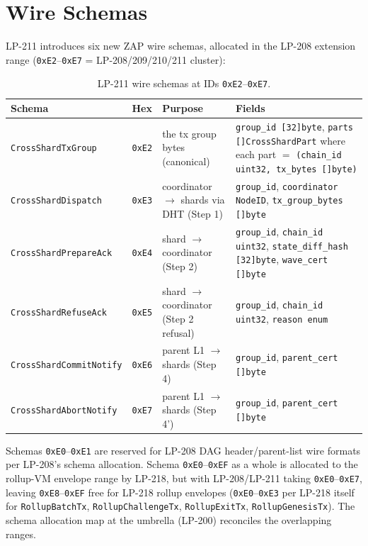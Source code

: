 \section{Wire Schemas}

LP-211 introduces six new ZAP wire schemas, allocated in the LP-208
extension range (\texttt{0xE2}--\texttt{0xE7} = LP-208/209/210/211
cluster):

\begin{table}[h]
\centering
\small
\begin{tabular}{@{}lllp{6cm}@{}}
\toprule
\textbf{Schema} & \textbf{Hex} & \textbf{Purpose} & \textbf{Fields} \\
\midrule
\texttt{CrossShardTxGroup} & \texttt{0xE2} & the tx group bytes (canonical) & \texttt{group\_id [32]byte}, \texttt{parts []CrossShardPart} where each part $=$ \texttt{(chain\_id uint32, tx\_bytes []byte)} \\
\texttt{CrossShardDispatch} & \texttt{0xE3} & coordinator $\to$ shards via DHT (Step 1) & \texttt{group\_id}, \texttt{coordinator NodeID}, \texttt{tx\_group\_bytes []byte} \\
\texttt{CrossShardPrepareAck} & \texttt{0xE4} & shard $\to$ coordinator (Step 2) & \texttt{group\_id}, \texttt{chain\_id uint32}, \texttt{state\_diff\_hash [32]byte}, \texttt{wave\_cert []byte} \\
\texttt{CrossShardRefuseAck} & \texttt{0xE5} & shard $\to$ coordinator (Step 2 refusal) & \texttt{group\_id}, \texttt{chain\_id uint32}, \texttt{reason enum} \\
\texttt{CrossShardCommitNotify} & \texttt{0xE6} & parent L1 $\to$ shards (Step 4) & \texttt{group\_id}, \texttt{parent\_cert []byte} \\
\texttt{CrossShardAbortNotify} & \texttt{0xE7} & parent L1 $\to$ shards (Step 4') & \texttt{group\_id}, \texttt{parent\_cert []byte} \\
\bottomrule
\end{tabular}
\caption{LP-211 wire schemas at IDs \texttt{0xE2}--\texttt{0xE7}.}
\label{tab:schemas}
\end{table}

Schemas \texttt{0xE0}--\texttt{0xE1} are reserved for LP-208 DAG
header/parent-list wire formats per LP-208's schema allocation.
Schema \texttt{0xE0}--\texttt{0xEF} as a whole is allocated to the
rollup-VM envelope range by LP-218, but with LP-208/LP-211 taking
\texttt{0xE0}--\texttt{0xE7}, leaving \texttt{0xE8}--\texttt{0xEF}
free for LP-218 rollup envelopes (\texttt{0xE0}--\texttt{0xE3} per
LP-218 itself for \texttt{RollupBatchTx},
\texttt{RollupChallengeTx}, \texttt{RollupExitTx},
\texttt{RollupGenesisTx}). The schema allocation map at the
umbrella (LP-200) reconciles the overlapping ranges.

